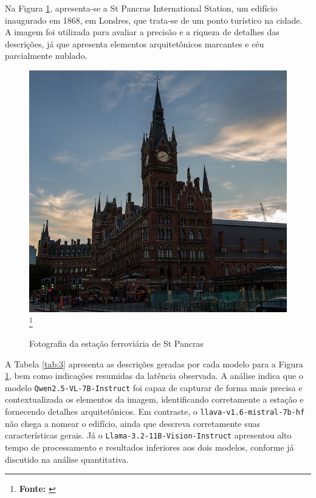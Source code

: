 Na Figura \ref{fig:8}, apresenta-se a St Pancras International Station, um edifício inaugurado em 1868, em Londres, que trata-se de um ponto turístico na cidade. A imagem foi utilizada para avaliar a precisão e a riqueza de detalhes das descrições, já que apresenta elementos arquitetônicos marcantes e céu parcialmente nublado.

\begin{figure}[!ht]
     \caption{Fotografia da estação ferroviária de St Pancras}
     \centering
     \includegraphics[width=0.7\linewidth]{imagens/st-pancreas.jpg}
     \label{fig:8}
     \footnote{\textbf{Fonte:} \cite{bromonschenkel2024cocopt}}
\end{figure}

A Tabela \ref{tab:3} apresenta as descrições geradas por cada modelo para a Figura \ref{fig:8}, bem como indicações resumidas da latência observada. A análise indica que o modelo \texttt{Qwen2.5-VL-7B-Instruct} foi capaz de capturar de forma mais precisa e contextualizada os elementos da imagem, identificando corretamente a estação e fornecendo detalhes arquitetônicos. Em contraste, o \texttt{llava-v1.6-mistral-7b-hf} não chega a nomear o edifício, ainda que descreva corretamente suas características gerais. Já o \texttt{Llama-3.2-11B-Vision-Instruct} apresentou alto tempo de processamento e resultados inferiores aos dois modelos, conforme já discutido na análise quantitativa.

